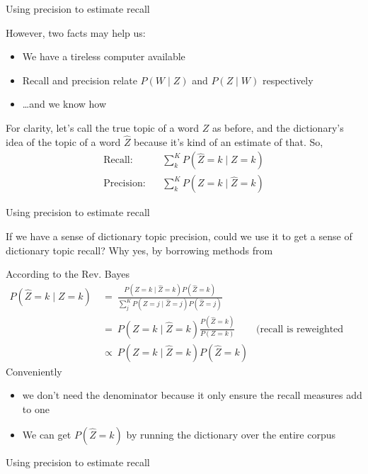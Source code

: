 \documentclass{hertieteaching}
\begin{document}
\begin{frame}{Using precision to estimate recall}


However, two facts may help us:
\begin{itemize}
  \item We have a tireless computer available
  \item Recall and precision relate $P(W \mid Z)$ and $P(Z \mid W)$ respectively
  \item \ldots and we know how
\end{itemize}

For clarity, let's call the true topic of a word $Z$ as before, and the dictionary's idea of the topic of a word $\hat{Z}$ because it's kind of an estimate of that. So,
\begin{align*}
\text{Recall:} & ~~~~ \sum^K_k P(\hat{Z}=k \mid Z=k)\\
\text{Precision:} & ~~~~ \sum^K_k P(Z=k \mid \hat{Z}=k)
\end{align*}

\end{frame}

\begin{frame}{Using precision to estimate recall}

If we have a sense of dictionary topic precision, could we use it to get a sense of dictionary topic recall? Why yes, by borrowing methods from \textcite{King.Lowe2003}
\pause

According to the Rev. Bayes
\begin{align*}
P(\hat{Z}=k \mid Z=k) &~=~ \frac{P(Z=k \mid \hat{Z}=k) P(\hat{Z}=k)}{\sum^K_j P(Z=j \mid \hat{Z}=j) P(\hat{Z}=j)} \\
                      &~=~ P(Z=k \mid \hat{Z}=k) \frac{P(\hat{Z}=k)}{P(Z=k)}& \text{(recall is reweighted precision)}\\
                      &~\propto~ P(Z=k \mid \hat{Z}=k) P(\hat{Z}=k) 
\end{align*}
Conveniently
\begin{itemize}
  \item we don't need the denominator because it only ensure the recall measures add to one
  \item We can get $P(\hat{Z}=k)$ by running the dictionary over the entire corpus
\end{itemize}
  
\end{frame}

\begin{frame}{Using precision to estimate recall}



\end{frame}
\end{document}
